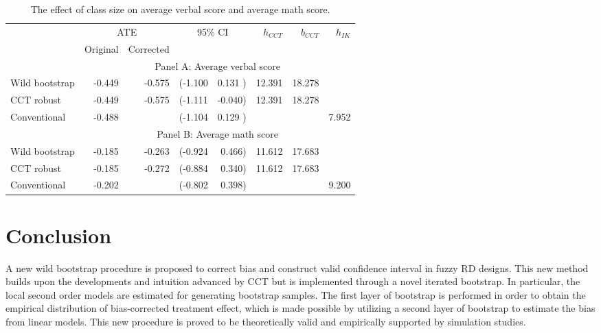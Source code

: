 \documentclass[12pt,]{article}
\DeclareMathOperator{\1}{\mathbbm{1}}
\begin{document}
\begin{table}[t]
	\centering
	\begin{tabular}{lrrrrrrr}
		\hline
		&\multicolumn{2}{c}{ATE}& \multicolumn{2}{c}{95\% CI}  &  $h_{CCT}$   &   $b_{CCT}$ & $h_{IK}$  \\ 
		& Original & Corrected &&&&& \\ \hline
		& \multicolumn{7}{c}{Panel A: Average verbal score} \\ \cline{2-8}
		Wild bootstrap    & -0.449 & -0.575 & (-1.100        & 0.131 )      & 12.391  &  18.278 &  \\
		CCT robust        & -0.449 & -0.575 & (-1.111        & -0.040)      & 12.391  &  18.278 &  \\
		Conventional      & -0.488 &        & (-1.104        & 0.129 )      &         &         & 7.952 \\
		
		&\multicolumn{7}{c}{Panel B: Average math score} \\ \cline{2-8}
		Wild bootstrap    & -0.185 & -0.263 & (-0.924        & 0.466)       & 11.612  &  17.683 &  \\
		CCT robust        & -0.185 & -0.272 & (-0.884        & 0.340)       & 11.612  &  17.683 &  \\
		Conventional      & -0.202 &        & (-0.802        & 0.398)       &         &         & 9.200 \\ \hline 
	\end{tabular}
	\caption{The effect of class size on average verbal score and average math score.}
	\label{tb: the effect of class size}
\end{table}

\section{Conclusion}

A new wild bootstrap procedure is proposed to correct bias and construct valid confidence interval in fuzzy RD designs. This new method builds upon the developments and intuition advanced by CCT but is implemented through a novel iterated bootstrap. In particular, the local second order models are estimated for generating bootstrap samples. The first layer of bootstrap is performed in order to obtain the empirical distribution of bias-corrected treatment effect, which is made possible by utilizing a second layer of bootstrap to estimate the bias from linear models. This new procedure is proved to be theoretically valid and empirically supported by simulation studies.
\end{document}
